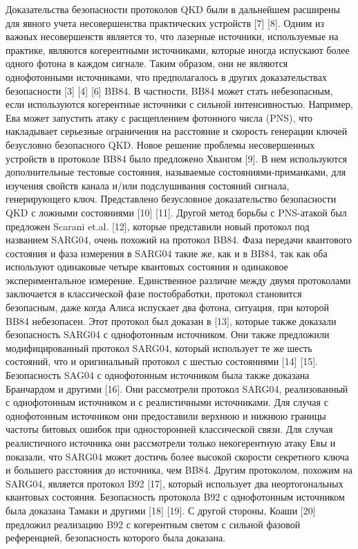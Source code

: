 Доказательства безопасности протоколов QKD были в дальнейшем расширены для явного учета несовершенства практических устройств [7] [8]. Одним из важных несовершенств является то, что лазерные источники, используемые на практике, являются когерентными источниками, которые иногда испускают более одного фотона в каждом сигнале. Таким образом, они не являются однофотонными источниками, что предполагалось в других доказательствах безопасности [3] [4] [6] BB84. В частности, BB84 может стать небезопасным, если используются когерентные источники с сильной интенсивностью. Например, Ева может запустить атаку с расщеплением фотонного числа (PNS), что накладывает серьезные ограничения на расстояние и скорость генерации ключей безусловно безопасного QKD. Новое решение проблемы несовершенных устройств в протоколе BB84 было предложено Хвангом [9]. В нем используются дополнительные тестовые состояния, называемые состояниями-приманками, для изучения свойств канала и/или подслушивания состояний сигнала, генерирующего ключ. Представлено безусловное доказательство безопасности QKD с ложными состояниями [10] [11]. Другой метод борьбы с PNS-атакой был предложен Scarani et.al. [12], которые представили новый протокол под названием SARG04, очень похожий на протокол BB84. Фаза передачи квантового состояния и фаза измерения в SARG04 такие же, как и в BB84, так как оба используют одинаковые четыре квантовых состояния и одинаковое экспериментальное измерение. Единственное различие между двумя протоколами заключается в классической фазе постобработки, протокол становится безопасным, даже когда Алиса испускает два фотона, ситуация, при которой BB84 небезопасен. Этот протокол был доказан в [13], которые также доказали безопасность SARG04 с однофотонным источником. Они также предложили модифицированный протокол SARG04, который использует те же шесть состояний, что и оригинальный протокол с шестью состояниями [14] [15]. Безопасность SAG04 с однофотонным источником была также доказана Бранчардом и другими [16]. Они рассмотрели протокол SARG04, реализованный с однофотонным источником и с реалистичными источниками. Для случая с однофотонным источником они предоставили верхнюю и нижнюю границы частоты битовых ошибок при односторонней классической связи. Для случая реалистичного источника они рассмотрели только некогерентную атаку Евы и показали, что SARG04 может достичь более высокой скорости секретного ключа и большего расстояния до источника, чем BB84. Другим протоколом, похожим на SARG04, является протокол B92 [17], который использует два неортогональных квантовых состояния. Безопасность протокола B92 с однофотонным источником была доказана Тамаки и другими [18] [19]. С другой стороны, Коаши [20] предложил реализацию B92 с когерентным светом с сильной фазовой референцией, безопасность которого была доказана.

